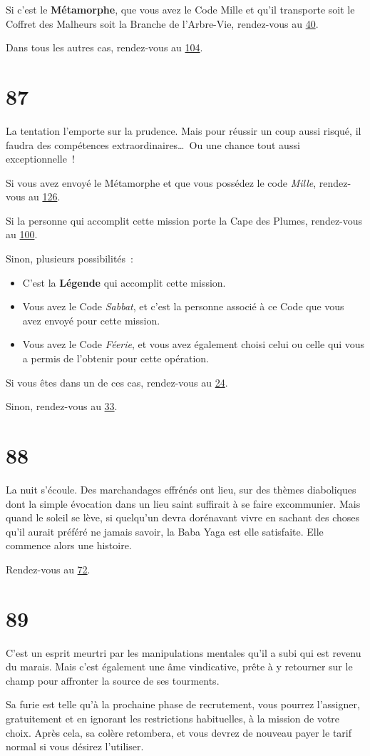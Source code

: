 \documentclass{report}
\newcommand{\gsection}[1]{
    \section{#1}
    \label{section-#1}
}
\newcommand{\glink}[1]{\hyperref[section-#1]{#1}}
\newcommand{\hero}[1]{\textbf{#1}}
\begin{document}
Si c'est le \hero{Métamorphe}, que vous avez le Code Mille et qu'il transporte soit le Coffret des Malheurs soit la Branche de l'Arbre-Vie, rendez-vous au \glink{40}.

Dans tous les autres cas, rendez-vous au \glink{104}.

\gsection{87}

La tentation l'emporte sur la prudence. Mais pour réussir un coup aussi risqué, il faudra des compétences extraordinaires\dots~Ou une chance tout aussi exceptionnelle !

Si vous avez envoyé le Métamorphe et que vous possédez le code \emph{Mille}, rendez-vous au \glink{126}.

Si la personne qui accomplit cette mission porte la Cape des Plumes, rendez-vous au \glink{100}.

Sinon, plusieurs possibilités :
\begin{itemize}
\item C'est la \hero{Légende} qui accomplit cette mission.
\item Vous avez le Code \emph{Sabbat}, et c'est la personne associé à ce Code que vous avez envoyé pour cette mission.
\item Vous avez le Code \emph{Féerie}, et vous avez également choisi celui ou celle qui vous a permis de l'obtenir pour cette opération.
\end{itemize}

Si vous êtes dans un de ces cas, rendez-vous au \glink{24}.

Sinon, rendez-vous au \glink{33}.

\gsection{88}

La nuit s'écoule. Des marchandages effrénés ont lieu, sur des thèmes diaboliques dont la simple évocation dans un lieu saint suffirait à se faire excommunier. Mais quand le soleil se lève, si quelqu'un devra dorénavant vivre en sachant des choses qu'il aurait préféré ne jamais savoir, la Baba Yaga est elle satisfaite. Elle commence alors une histoire.

Rendez-vous au \glink{72}.

\gsection{89}

C'est un esprit meurtri par les manipulations mentales qu'il a subi qui est revenu du marais. Mais c'est également une âme vindicative, prête à y retourner sur le champ pour affronter la source de ses tourments.

Sa furie est telle qu'à la prochaine phase de recrutement, vous pourrez l'assigner, gratuitement et en ignorant les restrictions habituelles, à la mission de votre choix. Après cela, sa colère retombera, et vous devrez de nouveau payer le tarif normal si vous désirez l'utiliser.
\end{document}
